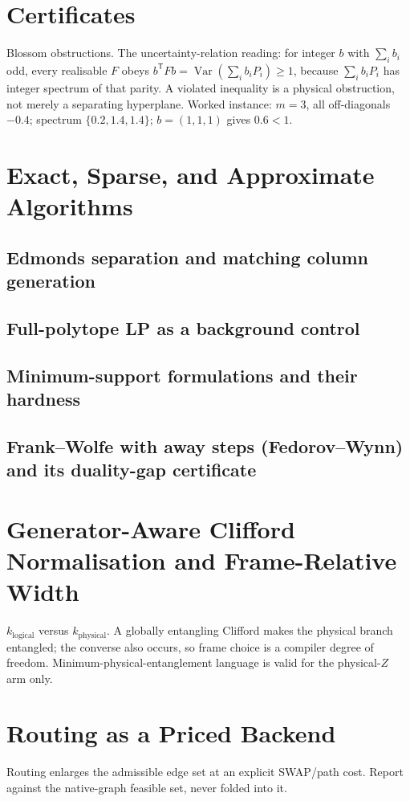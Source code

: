 \documentclass[11pt]{article}
\begin{document}
\section{Certificates}
Blossom obstructions. The uncertainty-relation reading: for integer $b$ with $\sum_ib_i$ odd,
every realisable $F$ obeys $b^{\mathsf T}Fb=\operatorname{Var}(\sum_ib_iP_i)\ge1$, because
$\sum_ib_iP_i$ has integer spectrum of that parity. A violated inequality is a physical
obstruction, not merely a separating hyperplane. Worked instance: $m=3$, all off-diagonals
$-0.4$; spectrum $\{0.2,1.4,1.4\}$; $b=(1,1,1)$ gives $0.6<1$.

\section{Exact, Sparse, and Approximate Algorithms}
\subsection{Edmonds separation and matching column generation}
\subsection{Full-polytope LP as a background control}
\subsection{Minimum-support formulations and their hardness}
\subsection{Frank--Wolfe with away steps (Fedorov--Wynn) and its duality-gap certificate}

\section{Generator-Aware Clifford Normalisation and Frame-Relative Width}
$k_{\mathrm{logical}}$ versus $k_{\mathrm{physical}}$. A globally entangling Clifford makes
the physical branch entangled; the converse also occurs, so frame choice is a compiler degree
of freedom. Minimum-physical-entanglement language is valid for the physical-$Z$ arm only.

\section{Routing as a Priced Backend}
Routing enlarges the admissible edge set at an explicit SWAP/path cost. Report against the
native-graph feasible set, never folded into it.
\end{document}

